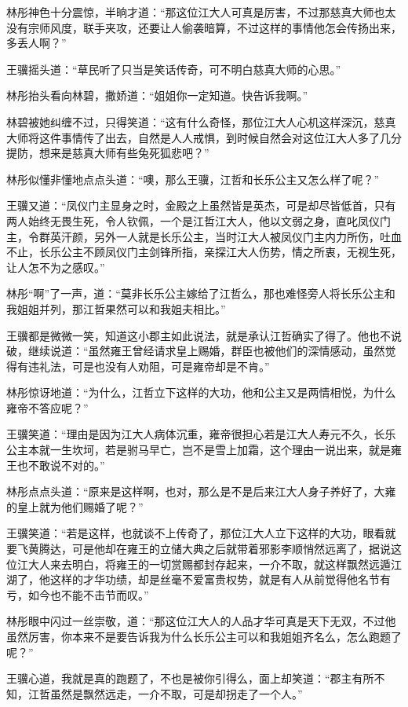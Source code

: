 林彤神色十分震惊，半晌才道：“那这位江大人可真是厉害，不过那慈真大师也太没有宗师风度，联手夹攻，还要让人偷袭暗算，不过这样的事情他怎会传扬出来，多丢人啊？”

王骥摇头道：“草民听了只当是笑话传奇，可不明白慈真大师的心思。”

林彤抬头看向林碧，撒娇道：“姐姐你一定知道。快告诉我啊。”

林碧被她纠缠不过，只得笑道：“这有什么奇怪，那位江大人心机这样深沉，慈真大师将这件事情传了出去，自然是人人戒惧，到时候自然会对这位江大人多了几分提防，想来是慈真大师有些兔死狐悲吧？”

林彤似懂非懂地点点头道：“噢，那么王骥，江哲和长乐公主又怎么样了呢？”

王骥又道：“凤仪门主显身之时，金殿之上虽然皆是英杰，可是却尽皆低首，只有两人始终无畏生死，令人钦佩，一个是江哲江大人，他以文弱之身，直叱凤仪门主，令群英汗颜，另外一人就是长乐公主，当时江大人被凤仪门主内力所伤，吐血不止，长乐公主不顾凤仪门主剑锋所指，亲探江大人伤势，情之所衷，无视生死，让人怎不为之感叹。”

林彤“啊”了一声，道：“莫非长乐公主嫁给了江哲么，那也难怪旁人将长乐公主和我姐姐并列，那江哲果然可以和我姐夫相比。”

王骥都是微微一笑，知道这小郡主如此说法，就是承认江哲确实了得了。他也不说破，继续说道：“虽然雍王曾经请求皇上赐婚，群臣也被他们的深情感动，虽然觉得有违礼法，可是也没有人劝阻，可是雍帝却是不肯。”

林彤惊讶地道：“为什么，江哲立下这样的大功，他和公主又是两情相悦，为什么雍帝不答应呢？”

王骥笑道：“理由是因为江大人病体沉重，雍帝很担心若是江大人寿元不久，长乐公主本就一生坎坷，若是驸马早亡，岂不是雪上加霜，这个理由一说出来，就是雍王也不敢说不对的。”

林彤点点头道：“原来是这样啊，也对，那么是不是后来江大人身子养好了，大雍的皇上就为他们赐婚了呢？”

王骥笑道：“若是这样，也就谈不上传奇了，那位江大人立下这样的大功，眼看就要飞黄腾达，可是他却在雍王的立储大典之后就带着邪影李顺悄然远离了，据说这位江大人来去明白，将雍王的一切赏赐都封存起来，一介不取，就这样飘然远遁江湖了，他这样的才华功绩，却是丝毫不爱富贵权势，就是有人从前觉得他名节有亏，如今也不能不击节而叹。”

林彤眼中闪过一丝崇敬，道：“那这位江大人的人品才华可真是天下无双，不过他虽然厉害，你本来不是要告诉我为什么长乐公主可以和我姐姐齐名么，怎么跑题了呢？”

王骥心道，我就是真的跑题了，不也是被你引得么，面上却笑道：“郡主有所不知，江哲虽然是飘然远走，一介不取，可是却拐走了一个人。”

